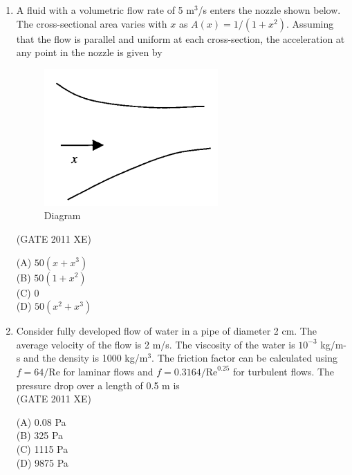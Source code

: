 \documentclass[journal,12pt,onecolumn]{IEEEtran}
\begin{document}
\begin{enumerate}
\newpage

\item A fluid with a volumetric flow rate of 5 m$^3$/s enters the nozzle shown below. The cross-sectional area varies with $x$ as $A(x) = 1/(1+x^2)$. Assuming that the flow is parallel and uniform at each cross-section, the acceleration at any point in the nozzle is given by\\

\begin{figure}[htbp]
  \centering
  \includegraphics[width=.65\columnwidth]{figs/B/fig3.png}
  \caption{Diagram}
  \label{fig:figs/B/fig3.png}
\end{figure}

\hfill{(GATE 2011 XE)} \\
\begin{multicols}{4}
(A) $50(x + x^3)$\\
(B) $50(1 + x^2)$\\
(C) $0$\\
(D) $50(x^2 + x^3)$
\end{multicols}

\item Consider fully developed flow of water in a pipe of diameter 2 cm. The average velocity of the flow is 2 m/s. The viscosity of the water is $10^{-3}$ kg/m-s and the density is 1000 kg/m$^3$. The friction factor can be calculated using $f = 64/\mathrm{Re}$ for laminar flows and $f = 0.3164/\mathrm{Re}^{0.25}$ for turbulent flows. The pressure drop over a length of 0.5 m is\\

\hfill{(GATE 2011 XE)} \\
\begin{multicols}{4}
(A) 0.08 Pa\\
(B) 325 Pa\\
(C) 1115 Pa\\
(D) 9875 Pa
\end{multicols}


\end{enumerate}
\end{document}
